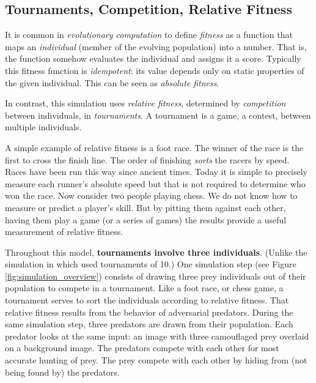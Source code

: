 \documentclass[acmtog,
    anonymous,
    review
    ]{acmart}
\newcommand{\jargon}[1]{\textit{#1}}
\begin{document}
\subsection{Tournaments, Competition, Relative Fitness}
\label{subsec:tournaments}
It is common in \jargon{evolutionary computation} to define \jargon{fitness} as a function that maps an \jargon{individual} (member of the evolving population) into a number. That is, the function somehow evaluates the individual and assigns it a score. Typically this fitness function is \jargon{idempotent}: its value depends only on static properties of the given individual. This can be seen as \jargon{absolute fitness}.
\par
In contrast, this simulation uses \jargon{relative fitness}, determined by \jargon{competition} between individuals, in \jargon{tournaments}. A tournament is a game, a contest, between multiple individuals. 
\par
A simple example of relative fitness is a foot race. The winner of the race is the first to cross the finish line. The order of finishing \jargon{sorts} the racers by speed. Races have been run this way since ancient times. Today it is simple to precisely measure each runner's absolute speed but that is not required to determine who won the race. Now consider two people playing chess. We do not know how to measure or predict a player's skill. But by pitting them against each other, having them play a game (or a series of games) the results provide a useful measurement of relative fitness. 
\par
Throughout this model, \textbf{tournaments involve three individuals}. (Unlike the simulation in \citet{reynolds_iec_2011} which used tournaments of 10.) One simulation step (see Figure \ref{fig:simulation_overview}) consists of drawing three prey individuals out of their population to compete in a tournament. Like a foot race, or chess game, a tournament serves to sort the individuals according to relative fitness. That relative fitness results from the behavior of adversarial predators. During the same simulation step, three predators are drawn from their population. Each predator looks at the same input: an image with three camouflaged prey overlaid on a background image. The predators compete with each other for most accurate hunting of prey. The prey compete with each other by hiding from (not being found by) the predators.
\par

\end{document}
